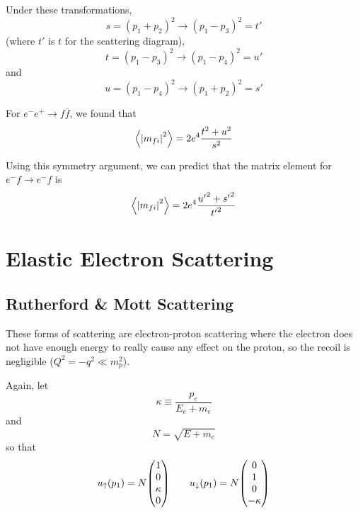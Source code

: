 \documentclass[a4paper,twoside,master.tex]{subfiles}
\begin{document}
Under these transformations,
\begin{equation}
    s = (p_1 + p_2)^2 \to (p_1 - p_3)^2 = t'
\end{equation}
(where $ t' $ is $ t $ for the scattering diagram),
\begin{equation}
    t = (p_1 - p_3)^2 \to (p_1 - p_4)^2 = u'
\end{equation}
and
\begin{equation}
    u = (p_1 - p_4)^2 \to (p_1 + p_2)^2 = s'
\end{equation}

For $ e^- e^+ \to f \bar{f} $, we found that
\begin{equation}
    \ev{\abs{m_{fi}}^2} = 2 e^4 \frac{t^2 + u^2}{s^2}
\end{equation}

Using this symmetry argument, we can predict that the matrix element for $ e^- f \to e^- f $ is
\begin{equation}
    \ev{\abs{m_{fi}}^2} = 2 e^4 \frac{ {u'}^2 + {s'}^2}{ {t'}^2}
\end{equation}


\section{Elastic Electron Scattering}\label{sec:elastic_electron_scattering}

\subsection{Rutherford \& Mott Scattering}\label{sub:rutherford_mott_scattering}

These forms of scattering are electron-proton scattering where the electron does not have enough energy to really cause any effect on the proton, so the recoil is negligible ($ Q^2 = - q^2 \ll m_p^2 $).

Again, let
\begin{equation}
    \kappa \equiv \frac{p_e}{E_e + m_e}
\end{equation}
and
\begin{equation}
    N = \sqrt{E + m_e}
\end{equation}
so that
\begin{equation}
    u_{\uparrow}(p_1) = N \mqty(1\\0\\ \kappa \\ 0) \qquad u_{\downarrow}(p_1) = N \mqty(0 \\ 1 \\ 0 \\ - \kappa)
\end{equation}
\end{document}
